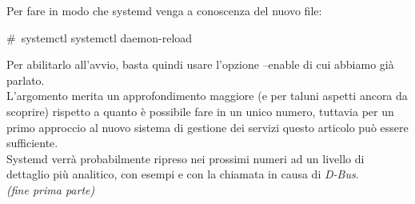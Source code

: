  Per fare in modo che systemd venga a conoscenza del nuovo file:
\begin{shaded}
{\color[cmyk]{0, 0, 0, 0}\#\ systemctl systemctl daemon-reload}
\end{shaded}

Per abilitarlo all'avvio, basta quindi usare l'opzione --enable di cui abbiamo già parlato.\\

L'argomento merita un approfondimento maggiore (e per taluni aspetti ancora da scoprire) rispetto a quanto è possibile fare in un unico numero, tuttavia per un primo approccio al nuovo sistema di gestione dei servizi questo articolo può essere sufficiente.\\

Systemd verrà probabilmente ripreso nei prossimi numeri ad un livello di dettaglio più analitico, con esempi e con la chiamata in causa di {\itshape D-Bus}.\\


\hfill {\itshape (fine prima parte)}




